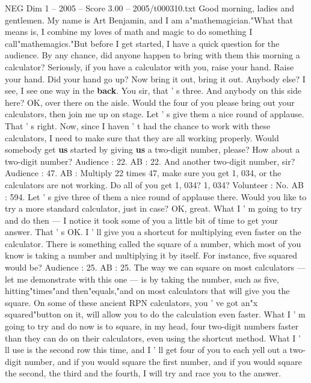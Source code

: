 \begin{textsample}{NEG Dim 1 – 2005 – Score 3.00 – 2005/t000310.txt}  \label{ex:f1_neg_076}
Good morning, ladies and gentlemen.
My name is Art Benjamin, and I am a"mathemagician."What that means is, I combine my loves of math and magic to do something I call"mathemagics."But before I get started, I have a quick question for the audience.
By any chance, did anyone happen to bring with them this morning a calculator?
Seriously, if you have a calculator with you, raise your hand.
Raise your hand.
Did your hand go up?
Now bring it out, bring it out.
Anybody else?
I see, I see one way in the \textbf{back}.
You sir, that ' s three.
And anybody on this side here?
OK, over there on the aisle.
Would the four of you please bring out your calculators, then join me up on stage.
Let ' s give them a nice round of applause.
That ' s right.
Now, since I haven ' t had the chance to work with these calculators, I need to make sure that they are all working properly.
Would somebody get \textbf{us} started by giving \textbf{us} a two-digit number, please?
How about a two-digit number?
Audience : 22.
AB : 22.
And another two-digit number, sir?
Audience : 47.
AB : Multiply 22 times 47, make sure you get 1, 034, or the calculators are not working.
Do all of you get 1, 034? 1, 034?
Volunteer : No.
AB : 594.
Let ' s give three of them a nice round of applause there.
Would you like to try a more standard calculator, just in case?
OK, great.
What I ' m going to try and do then — I notice it took some of you a little bit of time to get your answer.
That ' s OK.
I ' ll give you a shortcut for multiplying even faster on the calculator.
There is something called the square of a number, which most of you know is taking a number and multiplying it by itself.
For instance, five squared would be?
Audience : 25.
AB : 25.
The way we can square on most calculators — let me demonstrate with this one — is by taking the number, such as five, hitting"times"and then"equals,"and on most calculators that will give you the square.
On some of these ancient RPN calculators, you ' ve got an"x squared"button on it, will allow you to do the calculation even faster.
What I ' m going to try and do now is to square, in my head, four two-digit numbers faster than they can do on their calculators, even using the shortcut method.
What I ' ll use is the second row this time, and I ' ll get four of you to each yell out a two-digit number, and if you would square the first number, and if you would square the second, the third and the fourth, I will try and race you to the answer.

\end{textsample}
